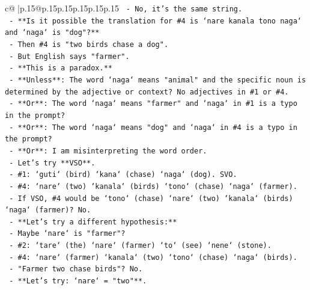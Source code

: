 \documentclass{article}
\begin{document}
{\begin{supertabular}{c@{$\;$}|p{.15\linewidth}@{}p{.15\linewidth}p{.15\linewidth}p{.15\linewidth}p{.15\linewidth}p{.15\linewidth}}
{{{\texttt{                           {-} No, it's the same string.} \\
\texttt{                           {-} **Is it possible the translation for \#4 is `nare kanala tono naga` and `naga` is "dog"?**} \\
\texttt{                           {-} Then \#4 is "two birds chase a dog".} \\
\texttt{                           {-} But English says "farmer".} \\
\texttt{                           {-} **This is a paradox.**} \\
\texttt{                           {-} **Unless**: The word `naga` means "animal" and the specific noun is determined by the adjective or context? No adjectives in \#1 or \#4.} \\
\texttt{                           {-} **Or**: The word `naga` means "farmer" and `naga` in \#1 is a typo in the prompt?} \\
\texttt{                           {-} **Or**: The word `naga` means "dog" and `naga` in \#4 is a typo in the prompt?} \\
\texttt{                           {-} **Or**: I am misinterpreting the word order.} \\
\texttt{                           {-} Let's try **VSO**.} \\
\texttt{                             {-} \#1: `guti` (bird) `kana` (chase) `naga` (dog). SVO.} \\
\texttt{                             {-} \#4: `nare` (two) `kanala` (birds) `tono` (chase) `naga` (farmer).} \\
\texttt{                             {-} If VSO, \#4 would be `tono` (chase) `nare` (two) `kanala` (birds) `naga` (farmer)? No.} \\
\texttt{                           {-} **Let's try a different hypothesis:**} \\
\texttt{                             {-} Maybe `nare` is "farmer"?} \\
\texttt{                               {-} \#2: `tare` (the) `nare` (farmer) `to` (see) `nene` (stone).} \\
\texttt{                               {-} \#4: `nare` (farmer) `kanala` (two) `tono` (chase) `naga` (birds).} \\
\texttt{                               {-} "Farmer two chase birds"? No.} \\
\texttt{                           {-} **Let's try: `nare` = "two"**.} \\
}}}
\end{supertabular}}
\end{document}

